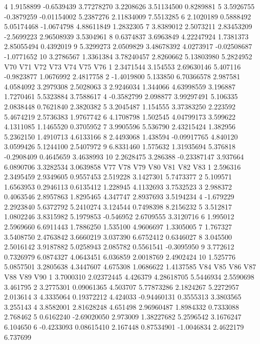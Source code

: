 \documentclass[12pt]{article}
\begin{document}
\begin{Schunk}
\begin{Soutput}
4  1.9158899 -0.6539439  3.77278270  3.2208626  3.51134500  0.8289881
5  3.5926755 -0.3879259 -0.01154002  5.2387276  2.11834009  7.5513285
6  2.1020189  0.5888492  5.05174468 -1.0674798  4.88611849  1.2832305
7  3.8389012  2.5073211  2.83453209 -2.5699223  2.96508939  3.5304961
8  0.6374837  3.6963849  4.22247924  1.7381373  2.85055494  0.4392019
9  5.3299273  2.0509829  3.48678392  4.0273917 -0.02508687 -1.0771652
10 3.2786567  1.3361384  3.78240457  2.8260662  5.13803980  5.2824952
          V70      V71         V72      V73        V74       V75       V76
1   2.3471544 3.154553  2.69630146 5.407116 -0.9823877 1.0676992 2.4817758
2  -1.4019800 5.133850  6.70366578 2.987581  4.0584092 3.2979308 2.5028063
3   2.9246034 1.344066  4.63998559 3.196887  1.7270461 5.5323884 3.7588617
4  -0.3582799 2.098877  3.99297491 5.106335  2.0838448 0.7621840 2.3820382
5   3.2045487 1.154555  3.37383250 2.223592  5.4674219 2.5736383 1.9767742
6   4.1708798 1.502545  4.04799173 3.599622  4.1311085 1.1465520 0.3705952
7   3.9905596 5.536790  2.43215424 1.382956  5.2362150 1.4910713 4.6133166
8   2.4493068 1.438594 -0.09917765 4.840120  3.0599426 5.1244100 2.5407972
9   6.8331460 1.575632  1.31935694 5.376818 -0.2908409 0.4645659 3.4638993
10  2.2628475 3.286388 -0.23387147 3.937664  6.0890706 3.3282534 3.0639858
         V77       V78       V79       V80       V81       V82        V83
1   2.596316 2.3495459 2.9349605 0.9557453  2.519228 3.1427301  5.7473377
2   5.109571 1.6563953 0.2946113 0.6135412  1.228945 4.1132693  3.7532523
3   2.988372 0.4063546 2.8957863 1.8295465  4.347747 2.8937693  3.5194234
4  -1.679229 2.2923840 5.6372792 5.2410274  3.124544 0.7498398  8.2156232
5   3.512817 1.0802246 3.8315982 5.1979853 -0.546952 2.6709555  3.3120716
6   1.995012 2.5969660 6.6911443 1.7886250  1.535100 4.9606697  1.3305005
7   1.767327 3.5408750 2.4763842 3.6660219  3.037390 6.6752412  0.6346027
8   3.045500 2.5016142 3.9187882 5.0258943  2.085782 0.5561541 -0.3095950
9   3.772612 0.7326979 6.0874327 4.0643451  6.036859 2.0018769  2.4902424
10  1.525776 5.0857501 3.2805638 4.3447607  4.675308 1.0686622  1.4137585
          V84         V85      V86         V87        V88       V89      V90
1   3.7000310  2.02372445 4.426379  4.28618705  5.5446934 2.5590698 3.461795
2   3.2775301  0.09061365 4.503707  5.77873286  2.1824267 5.2272957 2.013614
3   4.3335064  0.19372212 4.424033 -0.94460131  0.3555313 3.3803565 3.255143
4   3.8582001  2.81628248 4.651498  2.96960487  1.8984332 0.7333088 2.768462
5   0.6162240 -2.69020050 2.973009  1.38227682  5.2596542 3.1676247 6.104650
6  -0.4233093  0.08615410 2.167448  0.87534901 -1.0046834 2.4622179 6.737699

\end{Soutput}
\end{Schunk}
\end{document}
